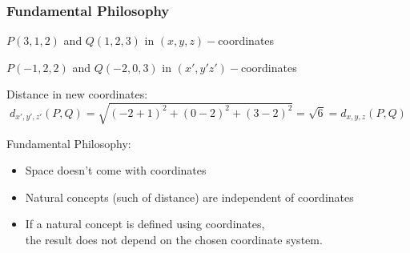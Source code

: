 \begin{frame}
 \frametitle{Fundamental Philosophy}
  $P(3,1,2)$ and $Q(1,2,3)$ in $(x,y,z)-$coordinates

  $P(-1,2,2)$ and $Q(-2,0,3)$ in $(x',y'z')-$coordinates

  Distance in new coordinates:
 \pause
%
$$d_{x',y',z'}(P,Q) = \sqrt{(-2+1)^2+(0-2)^2+(3-2)^2} = \sqrt{6} = d_{x,y,z}(P,Q)$$

Fundamental Philosophy:\pause
\begin{itemize}
 \item Space doesn't come with coordinates
  \item Natural concepts (such of distance) are independent of coordinates
  \item If a natural concept is defined using coordinates, \\
          the result does not depend on the chosen coordinate system.
\end{itemize}


\end{frame}